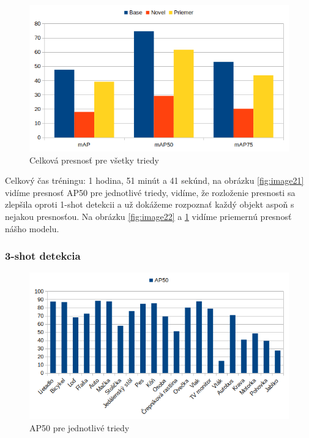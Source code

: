 \begin{figure}[H]
\includegraphics[width=\textwidth]{images/2_shot_meanAP.png}
\centering
\caption{Celková presnosť pre všetky triedy}
\label{fig:image23}
\end{figure}

Celkový čas tréningu: 1 hodina, 51 minút a 41 sekúnd, na obrázku \ref{fig:image21} vidíme presnosť AP50 pre jednotlivé triedy, vidíme, že rozloženie presnosti sa zlepšila oproti 1-shot detekcii a už dokážeme rozpoznať každý objekt aspoň s nejakou presnosťou. Na obrázku \ref{fig:image22} a \ref{fig:image23} vidíme priemernú presnosť nášho modelu.

\subsubsection{3-shot detekcia}

\begin{figure}[H]
\includegraphics[width=\textwidth]{images/3_shot_classes_AP50.png}
\centering
\caption{AP50 pre jednotlivé triedy}
\label{fig:image25}
\end{figure}

